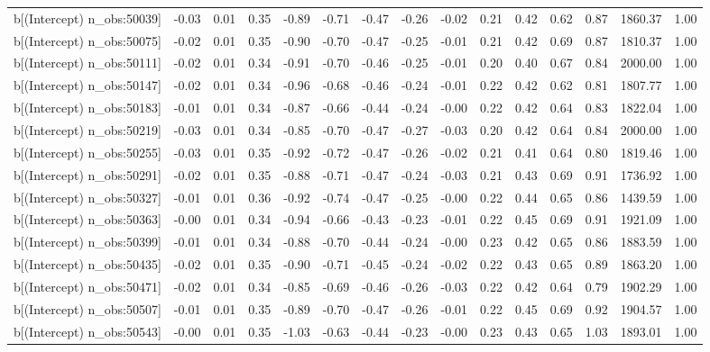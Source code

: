 \begin{table}[ht]
\begin{tabular}{rrrrrrrrrrrrrrr}
  b[(Intercept) n\_obs:50039] & -0.03 & 0.01 & 0.35 & -0.89 & -0.71 & -0.47 & -0.26 & -0.02 & 0.21 & 0.42 & 0.62 & 0.87 & 1860.37 & 1.00 \\ 
  b[(Intercept) n\_obs:50075] & -0.02 & 0.01 & 0.35 & -0.90 & -0.70 & -0.47 & -0.25 & -0.01 & 0.21 & 0.42 & 0.69 & 0.87 & 1810.37 & 1.00 \\ 
  b[(Intercept) n\_obs:50111] & -0.02 & 0.01 & 0.34 & -0.91 & -0.70 & -0.46 & -0.25 & -0.01 & 0.20 & 0.40 & 0.67 & 0.84 & 2000.00 & 1.00 \\ 
  b[(Intercept) n\_obs:50147] & -0.02 & 0.01 & 0.34 & -0.96 & -0.68 & -0.46 & -0.24 & -0.01 & 0.22 & 0.42 & 0.62 & 0.81 & 1807.77 & 1.00 \\ 
  b[(Intercept) n\_obs:50183] & -0.01 & 0.01 & 0.34 & -0.87 & -0.66 & -0.44 & -0.24 & -0.00 & 0.22 & 0.42 & 0.64 & 0.83 & 1822.04 & 1.00 \\ 
  b[(Intercept) n\_obs:50219] & -0.03 & 0.01 & 0.34 & -0.85 & -0.70 & -0.47 & -0.27 & -0.03 & 0.20 & 0.42 & 0.64 & 0.84 & 2000.00 & 1.00 \\ 
  b[(Intercept) n\_obs:50255] & -0.03 & 0.01 & 0.35 & -0.92 & -0.72 & -0.47 & -0.26 & -0.02 & 0.21 & 0.41 & 0.64 & 0.80 & 1819.46 & 1.00 \\ 
  b[(Intercept) n\_obs:50291] & -0.02 & 0.01 & 0.35 & -0.88 & -0.71 & -0.47 & -0.24 & -0.03 & 0.21 & 0.43 & 0.69 & 0.91 & 1736.92 & 1.00 \\ 
  b[(Intercept) n\_obs:50327] & -0.01 & 0.01 & 0.36 & -0.92 & -0.74 & -0.47 & -0.25 & -0.00 & 0.22 & 0.44 & 0.65 & 0.86 & 1439.59 & 1.00 \\ 
  b[(Intercept) n\_obs:50363] & -0.00 & 0.01 & 0.34 & -0.94 & -0.66 & -0.43 & -0.23 & -0.01 & 0.22 & 0.45 & 0.69 & 0.91 & 1921.09 & 1.00 \\ 
  b[(Intercept) n\_obs:50399] & -0.01 & 0.01 & 0.34 & -0.88 & -0.70 & -0.44 & -0.24 & -0.00 & 0.23 & 0.42 & 0.65 & 0.86 & 1883.59 & 1.00 \\ 
  b[(Intercept) n\_obs:50435] & -0.02 & 0.01 & 0.35 & -0.90 & -0.71 & -0.45 & -0.24 & -0.02 & 0.22 & 0.43 & 0.65 & 0.89 & 1863.20 & 1.00 \\ 
  b[(Intercept) n\_obs:50471] & -0.02 & 0.01 & 0.34 & -0.85 & -0.69 & -0.46 & -0.26 & -0.03 & 0.22 & 0.42 & 0.64 & 0.79 & 1902.29 & 1.00 \\ 
  b[(Intercept) n\_obs:50507] & -0.01 & 0.01 & 0.35 & -0.89 & -0.70 & -0.47 & -0.26 & -0.01 & 0.22 & 0.45 & 0.69 & 0.92 & 1904.57 & 1.00 \\ 
  b[(Intercept) n\_obs:50543] & -0.00 & 0.01 & 0.35 & -1.03 & -0.63 & -0.44 & -0.23 & -0.00 & 0.23 & 0.43 & 0.65 & 1.03 & 1893.01 & 1.00 \\ 

\end{tabular}
\end{table}
